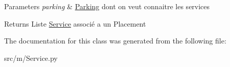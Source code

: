 \begin{DoxyParams}{Parameters}
{\em parking} & \hyperlink{namespacesrc_1_1m_1_1_parking}{Parking} dont on veut connaitre les services \\
\hline
\end{DoxyParams}
\begin{DoxyReturn}{Returns}
Liste \hyperlink{classsrc_1_1m_1_1_service_1_1_service}{Service} associé a un Placement 
\end{DoxyReturn}


The documentation for this class was generated from the following file\+:\begin{DoxyCompactItemize}
\item 
src/m/Service.\+py\end{DoxyCompactItemize}
